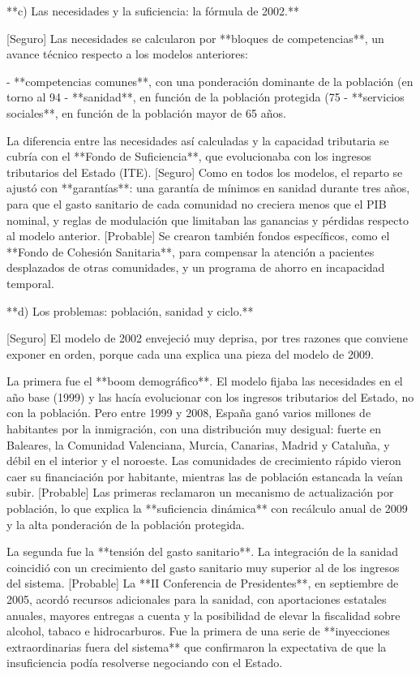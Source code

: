 \documentclass[10pt,a4paper]{article}
\begin{document}
**c) Las necesidades y la suficiencia: la fórmula de 2002.**

[Seguro] Las necesidades se calcularon por **bloques de competencias**, un avance técnico respecto a los modelos anteriores:

- **competencias comunes**, con una ponderación dominante de la población (en torno al 94%
- **sanidad**, en función de la población protegida (75%
- **servicios sociales**, en función de la población mayor de 65 años.

La diferencia entre las necesidades así calculadas y la capacidad tributaria se cubría con el **Fondo de Suficiencia**, que evolucionaba con los ingresos tributarios del Estado (ITE). [Seguro] Como en todos los modelos, el reparto se ajustó con **garantías**: una garantía de mínimos en sanidad durante tres años, para que el gasto sanitario de cada comunidad no creciera menos que el PIB nominal, y reglas de modulación que limitaban las ganancias y pérdidas respecto al modelo anterior. [Probable] Se crearon también fondos específicos, como el **Fondo de Cohesión Sanitaria**, para compensar la atención a pacientes desplazados de otras comunidades, y un programa de ahorro en incapacidad temporal.

**d) Los problemas: población, sanidad y ciclo.**

[Seguro] El modelo de 2002 envejeció muy deprisa, por tres razones que conviene exponer en orden, porque cada una explica una pieza del modelo de 2009.

La primera fue el **boom demográfico**. El modelo fijaba las necesidades en el año base (1999) y las hacía evolucionar con los ingresos tributarios del Estado, no con la población. Pero entre 1999 y 2008, España ganó varios millones de habitantes por la inmigración, con una distribución muy desigual: fuerte en Baleares, la Comunidad Valenciana, Murcia, Canarias, Madrid y Cataluña, y débil en el interior y el noroeste. Las comunidades de crecimiento rápido vieron caer su financiación por habitante, mientras las de población estancada la veían subir. [Probable] Las primeras reclamaron un mecanismo de actualización por población, lo que explica la **suficiencia dinámica** con recálculo anual de 2009 y la alta ponderación de la población protegida.

La segunda fue la **tensión del gasto sanitario**. La integración de la sanidad coincidió con un crecimiento del gasto sanitario muy superior al de los ingresos del sistema. [Probable] La **II Conferencia de Presidentes**, en septiembre de 2005, acordó recursos adicionales para la sanidad, con aportaciones estatales anuales, mayores entregas a cuenta y la posibilidad de elevar la fiscalidad sobre alcohol, tabaco e hidrocarburos. Fue la primera de una serie de **inyecciones extraordinarias fuera del sistema** que confirmaron la expectativa de que la insuficiencia podía resolverse negociando con el Estado.
\end{document}
